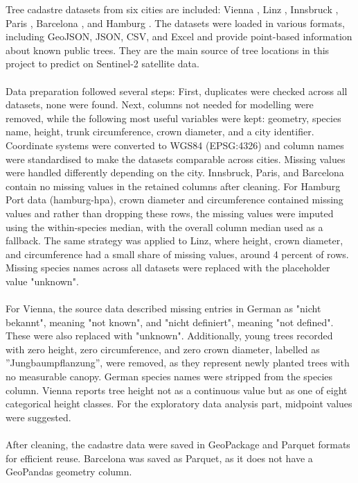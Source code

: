 Tree cadastre datasets from six cities are included: Vienna \cite{baumkataster2025}, Linz \cite{linzcadastre}, Innsbruck \cite{innsbruckcadastre}, Paris \cite{parisarbres}, Barcelona \cite{barcelonaarbrat}, and Hamburg \cite{hamburgbaumkataster}. The datasets were loaded in various formats, including GeoJSON, JSON, CSV, and Excel and provide point-based information about known public trees. They are the main source of tree locations in this project to predict on Sentinel-2 satellite data.\\
\\
Data preparation followed several steps: First, duplicates were checked across all datasets, none were found. Next, columns not needed for modelling were removed, while the following most useful variables were kept: geometry, species name, height, trunk circumference, crown diameter, and a city identifier. Coordinate systems were converted to WGS84 (EPSG:4326) and column names were standardised to make the datasets comparable across cities. Missing values were handled differently depending on the city. Innsbruck, Paris, and Barcelona contain no missing values in the retained columns after cleaning. For Hamburg Port data (hamburg-hpa), crown diameter and circumference contained missing values and rather than dropping these rows, the missing values were imputed using the within-species median, with the overall column median used as a fallback. The same strategy was applied to Linz, where height, crown diameter, and circumference had a small share of missing values, around 4 percent of rows. Missing species names across all datasets were replaced with the placeholder value "unknown".\\
\\
 For Vienna, the source data described missing entries in German as "nicht bekannt", meaning "not known", and "nicht definiert", meaning "not defined". These were also replaced with "unknown". Additionally, young trees recorded with zero height, zero circumference, and zero crown diameter, labelled as ''Jungbaumpflanzung'', were removed, as they represent newly planted trees with no measurable canopy. German species names were stripped from the species column. Vienna reports tree height not as a continuous value but as one of eight categorical height classes. For the exploratory data analysis part, midpoint values were suggested.\\
\\
After cleaning, the cadastre data were saved in GeoPackage and Parquet formats for efficient reuse. Barcelona was saved as Parquet, as it does not have a GeoPandas geometry column.

